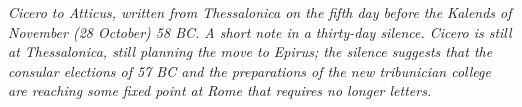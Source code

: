 
\textit{Cicero to Atticus, written from Thessalonica on the
fifth day before the Kalends of November (28 October) 58 BC.
A short note in a thirty-day silence. Cicero is still at
Thessalonica, still planning the move to Epirus; the silence
suggests that the consular elections of 57 BC and the
preparations of the new tribunician college are reaching some
fixed point at Rome that requires no longer letters.}
